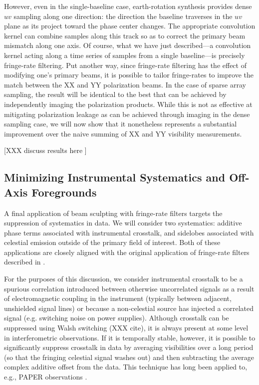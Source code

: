 \documentclass[twocolumn,apj,numberedappendix]{emulateapj}
\begin{document}
However, even in the single-baseline case, earth-rotation synthesis provides dense $uv$ sampling along one direction: the
direction the baseline traverses in the $uv$ plane as its project toward the phase center changes.  The appropriate
convolution kernel can combine samples along this track so as to correct the primary beam mismatch along one axis.
Of course, what we have just described---a convolution kernel acting along a time series
of samples from a single baseline---is precisely fringe-rate filtering.  Put another way, since fringe-rate filtering has the effect of modifying one's primary beams, it is possible to tailor fringe-rates to improve the match between the XX and YY polarization beams. In the case of sparse array sampling, the result will be identical to the best that can be achieved by independently
imaging the polarization products.  While this is not as effective at mitigating polarization leakage as can be achieved
through imaging in the dense sampling case, we will now show that it nonetheless represents a substantial improvement
over the naive summing of XX and YY visibility measurements.

[XXX discuss results here ]

\subsection{Minimizing Instrumental Systematics and Off-Axis Foregrounds}
\label{sec:foregrounds}


A final application of beam sculpting with fringe-rate filters targets the suppression of systematics in data.
We will consider two systematics: additive phase terms associated with instrumental crosstalk, and sidelobes
associated with celestial emission outside of the primary field of interest.  Both of these applications are 
closely aligned with the original application of fringe-rate filters described in \citet{parsons_backer2009}.

For the purposes of this discussion, we consider instrumental crosstalk to be a spurious 
correlation introduced between otherwise uncorrelated signals
as a result of electromagnetic coupling in the instrument (typically between adjacent, unshielded signal lines)
or because a non-celestial source has injected a correlated signal (e.g. switching noise on power supplies).
Although crosstalk can be suppressed using Walsh switching (XXX cite), it is always present at some level
in interferometric observations.  If it is temporally stable, however, it is possible to significantly
suppress crosstalk in data by averaging visibilities over a long period (so that the fringing celestial
signal washes out) and then subtracting the average complex additive offset from the data.  This 
technique has
long been applied to, e.g., PAPER observations \citep{parsons_et_al2010,jacobs_et_al,pober_et_al,P14}.
\end{document}
